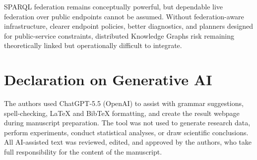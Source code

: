 \documentclass[runningheads]{llncs}
\begin{document}
SPARQL federation remains conceptually powerful, but dependable live federation over public endpoints cannot be assumed. 
Without federation-aware infrastructure, clearer endpoint policies, better diagnostics, and planners designed for public-service constraints, distributed Knowledge Graphs risk remaining theoretically linked but operationally difficult to integrate.



\section*{Declaration on Generative AI}
The authors used ChatGPT-5.5 (OpenAI) to assist with grammar suggestions, spell-checking, LaTeX and BibTeX formatting, and create the result webpage\cite{fedSurveyResultsRepo} during manuscript preparation. 
The tool was not used to generate research data, perform experiments, conduct statistical analyses, or draw scientific conclusions. 
All AI-assisted text was reviewed, edited, and approved by the authors, who take full responsibility for the content of the manuscript.



\end{document}
